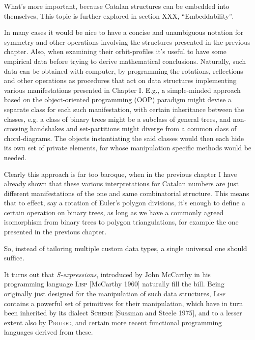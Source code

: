 \documentclass[11pt]{article} %
\makeatletter
\newcommand{\proglangname}[1]{{\textsc{#1}}}
\def\section{\@startsection {section}{1}{\z@}{-3.5ex plus -1ex minus
 -.2ex}{2.3ex plus .2ex}{\normalsize\bf}}
\makeatother
\begin{document}
What's more important, because Catalan structures
can be embedded into themselves, 
This topic is further explored in section XXX, ``Embeddability''.




%
%
%
%


\section{S-expressions}\label{Sec2}


In many cases it would be nice to have a concise and unambiguous notation
for symmetry and other operations involving the structures presented in the
previous chapter. Also, when examining their orbit-profiles it's useful
to have some empirical data before trying to derive mathematical conclusions.
Naturally, such data can be obtained with computer, by programming the
rotations, reflections and other operations as procedures that act on
data structures implementing various manifestations presented in Chapter I.
E.g., a simple-minded approach based on the object-oriented programming (OOP)
paradigm might devise a separate class for each such manifestation, with
certain inheritance between the classes, e.g. a class of binary trees might
be a subclass of general trees, and non-crossing handshakes and set-partitions
might diverge from a common class of chord-diagrams.
The objects instantiating the said classes would then each hide
its own set of private elements, for whose manipulation specific
methods would be needed.

Clearly this approach is far too baroque, when in the previous chapter
I have already shown that these various interpretations for
Catalan numbers are just different manifestations of the one and
same combinatorial structure. This means that to effect, say a rotation
of Euler's polygon divisions, it's enough to define a certain
operation on binary trees, as long as we have a commonly agreed
isomorphism from binary trees to polygon triangulations,
for example the one presented in the previous chapter.

So, instead of tailoring multiple custom data types, a single
universal one should suffice.

It turns out that {\em S-expressions}, introduced by John McCarthy
in his programming language \proglangname{Lisp} [McCarthy 1960] naturally  fill the bill. %
Being originally just designed for the manipulation of such
data structures, \proglangname{Lisp} contains a powerful set of primitives
for their manipulation, which have in turn been inherited
by its dialect \proglangname{Scheme} [Sussman and Steele 1975],
and to a lesser extent also by \proglangname{Prolog}, and certain more recent functional
programming languages derived from these.
\end{document}
